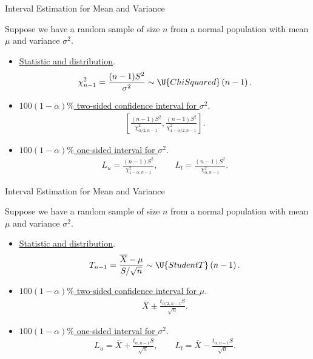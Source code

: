 \begin{frame}{Interval Estimation for Mean and Variance}

\justifying
{} Suppose we have a random sample of size $n$ from a normal population with  mean $\mu$ and  variance $\sigma^2$.
\begin{itemize}
\item \underline{Statistic and distribution}.
\begin{align*}
\chi_{n-1}^2 = \frac{(n-1)S^2}{\sigma^2} \sim \U{ChiSquared}\left(n-1 \right).
\end{align*}
\item \underline{$100(1-\alpha)\%$ two-sided confidence interval for $\sigma^2$}.
\begin{align*}
\left[\frac{(n-1)S^2}{\chi_{\alpha/2, n-1}^2}, \frac{(n-1)S^2}{\chi_{1-\alpha/2, n-1}^2} \right].
\end{align*}
\item \underline{$100(1-\alpha)\%$ one-sided interval for $\sigma^2$}.
\begin{align*}
L_u = \frac{(n-1)S^2}{\chi_{1-\alpha, n-1}^2}, \qquad L_l = \frac{(n-1)S^2}{\chi_{\alpha, n-1}^2}.
\end{align*}
\end{itemize}

\end{frame}


\begin{frame}{Interval Estimation for Mean and Variance}

\justifying
{} Suppose we have a random sample of size $n$ from a normal population with  mean $\mu$ and  variance $\sigma^2$.
\begin{itemize}
\item \underline{Statistic and distribution}.
\begin{align*}
T_{n-1} = \frac{\overline{X} - \mu}{S/\sqrt{n}} \sim \U{StudentT}\left(n-1 \right).
\end{align*}
\item \underline{$100(1-\alpha)\%$ two-sided confidence interval for $\mu$}.
\begin{align*}
\overline{X} \pm \frac{t_{\alpha/2, n-1} S}{\sqrt{n}}.
\end{align*}
\item \underline{$100(1-\alpha)\%$ one-sided interval for $\sigma^2$}.
\begin{align*}
L_u = \overline{X} + \frac{t_{\alpha, n-1}S}{\sqrt{n}}, \qquad L_l = \overline{X} - \frac{t_{\alpha, n-1}S}{\sqrt{n}}.
\end{align*}
\end{itemize}

\end{frame}


